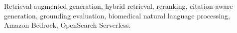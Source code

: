 \documentclass[conference]{IEEEtran}
\begin{document}
\begin{IEEEkeywords}
Retrieval-augmented generation, hybrid retrieval, reranking, citation-aware generation, grounding evaluation, biomedical natural language processing, Amazon Bedrock, OpenSearch Serverless.
\end{IEEEkeywords}




\end{document}
